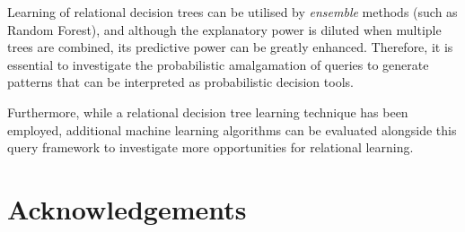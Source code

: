\documentclass[mathematics,article,submit,pdftex,moreauthors]{Definitions/mdpi}
\begin{document}
Learning of relational decision trees can be utilised by \textit{ensemble} methods (such as Random Forest), and although the explanatory power is diluted when multiple trees are combined, its predictive power can be greatly enhanced. Therefore, it is essential to investigate the probabilistic amalgamation of queries to generate patterns that can be interpreted as probabilistic decision tools. 

Furthermore, while a relational decision tree learning technique has been employed, additional machine learning algorithms can be evaluated alongside this query framework to investigate more opportunities for relational learning.

\section*{Acknowledgements}


\vspace{6pt} 



\end{document}
